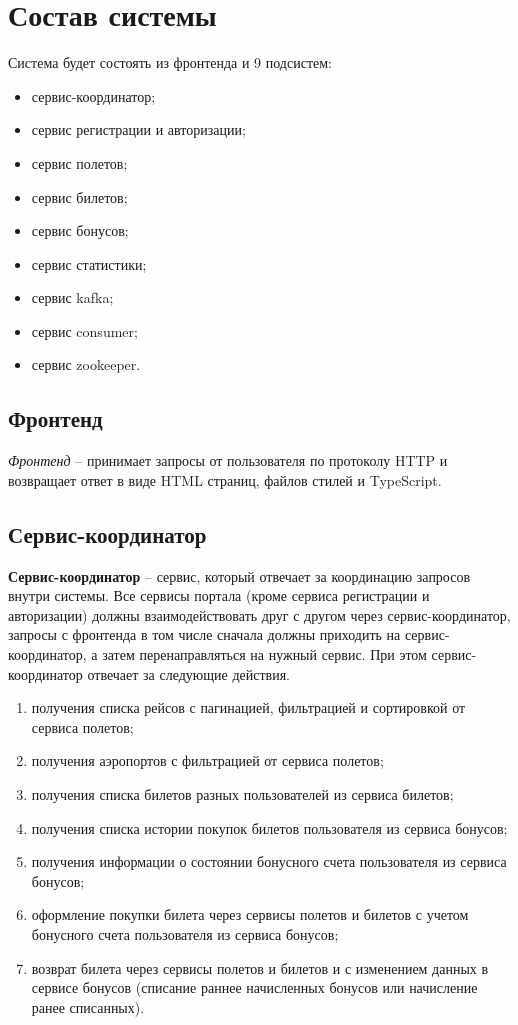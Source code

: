 \section{Состав системы}

Система будет состоять из фронтенда и 9 подсистем:
\begin{itemize}
	\item сервис-координатор;
	\item сервис регистрации и авторизации;
  \item сервис полетов;
  \item сервис билетов;
  \item сервис бонусов;
  \item сервис статистики;
  \item сервис kafka;
  \item сервис consumer;
  \item сервис zookeeper.
\end{itemize}


\subsection{Фронтенд}

\textit{Фронтенд} -- принимает запросы от пользователя по протоколу HTTP и возвращает ответ в виде HTML страниц, файлов стилей и TypeScript.


\subsection{Сервис-координатор}

\textbf{Сервис-координатор} -- сервис, который отвечает за координацию запросов внутри системы. Все сервисы портала (кроме сервиса регистрации и авторизации) должны взаимодействовать друг с другом через сервис-координатор, запросы с фронтенда в том числе сначала должны приходить на сервис-координатор, а затем перенаправляться на нужный сервис. При этом сервис-координатор отвечает за следующие действия.
\begin{enumerate}
	\item получения списка рейсов с пагинацией, фильтрацией и сортировкой от сервиса полетов;
	\item получения аэропортов с фильтрацией от сервиса полетов;
	\item получения списка билетов разных пользователей из сервиса билетов;
	\item получения списка истории покупок билетов пользователя из сервиса бонусов;
	\item получения информации о состоянии бонусного счета пользователя из сервиса бонусов;
  \item оформление покупки билета через сервисы полетов и билетов с учетом бонусного счета пользователя из сервиса бонусов;
	\item возврат билета через сервисы полетов и билетов и с изменением данных в сервисе бонусов (списание раннее начисленных бонусов или начисление ранее списанных).
\end{enumerate}



